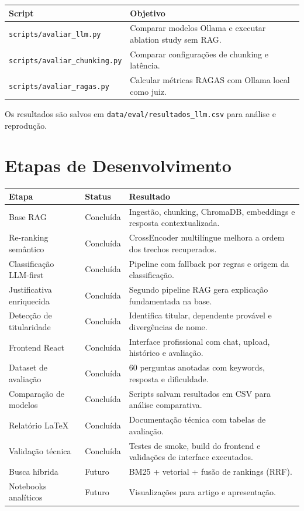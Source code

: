 \documentclass[11pt,a4paper,oneside]{article}
\begin{document}
\begin{center}
\begin{tabularx}{\textwidth}{@{}L{68mm}Y@{}}
\toprule
\textbf{Script} & \textbf{Objetivo} \\
\midrule
\texttt{scripts/avaliar\_llm.py} & Comparar modelos Ollama e executar ablation study sem RAG. \\
\texttt{scripts/avaliar\_chunking.py} & Comparar configurações de chunking e latência. \\
\texttt{scripts/avaliar\_ragas.py} & Calcular métricas RAGAS com Ollama local como juiz. \\
\bottomrule
\end{tabularx}
\end{center}

Os resultados são salvos em \texttt{data/eval/resultados\_llm.csv} para análise e reprodução.

\section{Etapas de Desenvolvimento}

\begin{longtable}{@{}L{62mm}L{22mm}L{72mm}@{}}
\toprule
\textbf{Etapa} & \textbf{Status} & \textbf{Resultado} \\
\midrule
\endhead
Base RAG & Concluída & Ingestão, chunking, ChromaDB, embeddings e resposta contextualizada. \\
Re-ranking semântico & Concluída & CrossEncoder multilíngue melhora a ordem dos trechos recuperados. \\
Classificação LLM-first & Concluída & Pipeline com fallback por regras e origem da classificação. \\
Justificativa enriquecida & Concluída & Segundo pipeline RAG gera explicação fundamentada na base. \\
Detecção de titularidade & Concluída & Identifica titular, dependente provável e divergências de nome. \\
Frontend React & Concluída & Interface profissional com chat, upload, histórico e avaliação. \\
Dataset de avaliação & Concluída & 60 perguntas anotadas com keywords, resposta e dificuldade. \\
Comparação de modelos & Concluída & Scripts salvam resultados em CSV para análise comparativa. \\
Relatório LaTeX & Concluída & Documentação técnica com tabelas de avaliação. \\
Validação técnica & Concluída & Testes de smoke, build do frontend e validações de interface executados. \\
Busca híbrida & Futuro & BM25 + vetorial + fusão de rankings (RRF). \\
Notebooks analíticos & Futuro & Visualizações para artigo e apresentação. \\
\bottomrule
\end{longtable}
\end{document}
